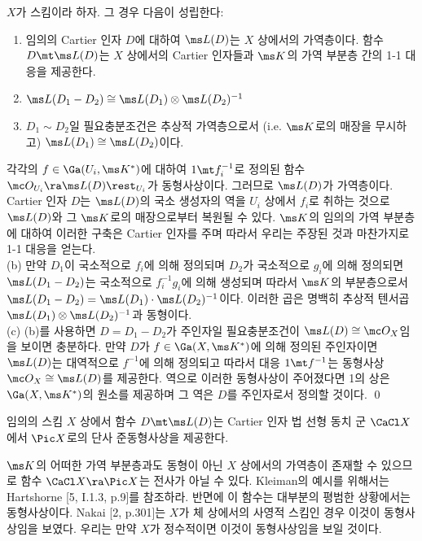 	
	\begin{proposition}
	$X$가 스킴이라 하자. 그 경우 다음이 성립한다:
	\begin{enumerate}[label=(\alph*)]
	\item 임의의 Cartier 인자 $D$에 대하여 $\ms L(D)$는 $X$ 상에서의 가역층이다.
	함수 $D\mt\ms L(D)$는 $X$ 상에서의 Cartier 인자들과 $\ms K$의 가역 부분층 간의 1-1 대응을 제공한다.
	\item $\ms L(D_1-D_2)\cong\ms L(D_1)\otimes\ms L(D_2)^{-1}$
	\item $D_1\sim D_2$일 필요충분조건은 추상적 가역층으로서 (i.e. $\ms K$로의 매장을 무시하고) $\ms L(D_1)\cong\ms L(D_2)$이다.\\
	\end{enumerate}
	\pf 각각의 $f\in\Ga(U_i,\ms K^*)$에 대하여 $1\mt f_i^{-1}$로 정의된 함수 $\mc O_{U_i}\ra\ms L(D)\rest_{U_i}$가 동형사상이다.
	그러므로 $\ms L(D)$가 가역층이다. Cartier 인자 $D$는 $\ms L(D)$의 국소 생성자의 역을 $U_i$ 상에서 $f_i$로 취하는 것으로
	$\ms L(D)$와 그 $\ms K$로의 매장으로부터 복원될 수 있다.
	$\ms K$의 임의의 가역 부분층에 대하여 이러한 구축은 Cartier 인자를 주며 따라서 우리는 주장된 것과 마찬가지로 1-1 대응을 얻는다.\\
	(b) 만약 $D_1$이 국소적으로 $f_i$에 의해 정의되며 $D_2$가 국소적으로 $g_i$에 의해 정의되면
	$\ms L(D_1-D_2)$는 국소적으로 $f_i^{-1}g_i$에 의해 생성되며
	따라서 $\ms K$의 부분층으로서 $\ms L(D_1-D_2)=\ms L(D_1)\cdot\ms L(D_2)^{-1}$이다.
	이러한 곱은 명백히 추상적 텐서곱 $\ms L(D_1)\otimes\ms L(D_2)^{-1}$과 동형이다.\\
	(c) (b)를 사용하면 $D=D_1-D_2$가 주인자일 필요충분조건이 $\ms L(D)\cong\mc O_X$임을 보이면 충분하다.
	만약 $D$가 $f\in\Ga(X,\ms K^*)$에 의해 정의된 주인자이면 $\ms L(D)$는 대역적으로 $f^{-1}$에 의해 정의되고
	따라서 대응 $1\mt f^{-1}$는 동형사상 $\mc O_X\cong\ms L(D)$를 제공한다.
	역으로 이러한 동형사상이 주어졌다면 1의 상은 $\Ga(X,\ms K^*)$의 원소를 제공하며 그 역은 $D$를 주인자로서 정의할 것이다.
	\qed
	\end{proposition}
	
	
	\begin{corollary}
	임의의 스킴 $X$ 상에서 함수 $D\mt\ms L(D)$는 Cartier 인자 법 선형 동치 군 $\CaCl X$에서 $\Pic X$로의 단사 준동형사상을 제공한다.
	\end{corollary}
	
	
	\begin{remark}
	$\ms K$의 어떠한 가역 부분층과도 동형이 아닌 $X$ 상에서의 가역층이 존재할 수 있으므로
	함수 $\CaCl X\ra\Pic X$는 전사가 아닐 수 있다. Kleiman의 예시를 위해서는 Hartshorne [5, I.1.3, p.9]를 참조하라.
	반면에 이 함수는 대부분의 평범한 상황에서는 동형사상이다.
	Nakai [2, p.301]는 $X$가 체 상에서의 사영적 스킴인 경우 이것이 동형사상임을 보였다.
	우리는 만약 $X$가 정수적이면 이것이 동형사상임을 보일 것이다.
	\end{remark}
	
